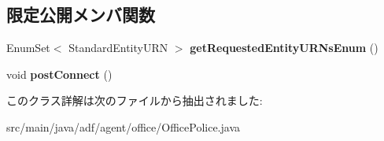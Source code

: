 \subsection*{限定公開メンバ関数}
\begin{DoxyCompactItemize}
\item 
\hypertarget{classadf_1_1agent_1_1office_1_1OfficePolice_ad5bc7fbdbb914c8d69d925b4b2e7ab35}{}\label{classadf_1_1agent_1_1office_1_1OfficePolice_ad5bc7fbdbb914c8d69d925b4b2e7ab35} 
Enum\+Set$<$ Standard\+Entity\+U\+RN $>$ {\bfseries get\+Requested\+Entity\+U\+R\+Ns\+Enum} ()
\item 
\hypertarget{classadf_1_1agent_1_1office_1_1OfficePolice_a350d6cfe44a08e7b57ed818725ff9cb0}{}\label{classadf_1_1agent_1_1office_1_1OfficePolice_a350d6cfe44a08e7b57ed818725ff9cb0} 
void {\bfseries post\+Connect} ()
\end{DoxyCompactItemize}


このクラス詳解は次のファイルから抽出されました\+:\begin{DoxyCompactItemize}
\item 
src/main/java/adf/agent/office/Office\+Police.\+java\end{DoxyCompactItemize}
